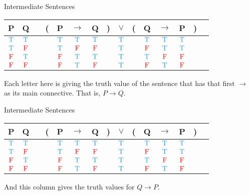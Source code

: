 \documentclass[
  ignorenonframetext,
]{beamer}
\renewcommand{\,}{\text{, }}
\def\True{\textcolor{dodgerblue}{\text{T}}}
\def\False{\textcolor{red}{\text{F}}}
\begin{document}
\begin{frame}{Intermediate Sentences}
\protect\hypertarget{intermediate-sentences-1}{}

\begin{center}
\begin{tabular}{@{ }c@{ }@{ }c | c@{ }@{}c@{}@{ }c@{ }@{ }c@{ }@{ }c@{ }@{}c@{}@{ }c@{ }@{}c@{}@{ }c@{ }@{ }c@{ }@{ }c@{ }@{}c@{}@{ }c}
P & Q &  & ( & P & $\rightarrow$ & Q & ) & $\lor$ & ( & Q & $\rightarrow$ & P & ) & \\
\hline 
$\True$ & $\True$ &  &  & $\True$ & \textbf{$\True$} & $\True$ &  & \textcolor{red}{$\True$} &  & $\True$ & $\True$ & $\True$ &  & \\
$\True$ & $\False$ &  &  & $\True$ & \textbf{$\False$} & $\False$ &  & \textcolor{red}{$\True$} &  & $\False$ & $\True$ & $\True$ &  & \\
$\False$ & $\True$ &  &  & $\False$ & \textbf{$\True$} & $\True$ &  & \textcolor{red}{$\True$} &  & $\True$ & $\False$ & $\False$ &  & \\
$\False$ & $\False$ &  &  & $\False$ & \textbf{$\True$} & $\False$ &  & \textcolor{red}{$\True$} &  & $\False$ & $\True$ & $\False$ &  & \\
\end{tabular}
\bigskip
\end{center}

Each letter here is giving the truth value of the sentence that has that
first \(\rightarrow\) as its main connective. That is,
\(P \rightarrow Q\).

\end{frame}

\begin{frame}{Intermediate Sentences}
\protect\hypertarget{intermediate-sentences-2}{}

\begin{center}
\begin{tabular}{@{ }c@{ }@{ }c | c@{ }@{}c@{}@{ }c@{ }@{ }c@{ }@{ }c@{ }@{}c@{}@{ }c@{ }@{}c@{}@{ }c@{ }@{ }c@{ }@{ }c@{ }@{}c@{}@{ }c}
P & Q &  & ( & P & $\rightarrow$ & Q & ) & $\lor$ & ( & Q & $\rightarrow$ & P & ) & \\
\hline 
$\True$ & $\True$ &  &  & $\True$ & $\True$ & $\True$ &  & \textcolor{red}{$\True$} &  & $\True$ & \textbf{$\True$} & $\True$ &  & \\
$\True$ & $\False$ &  &  & $\True$ & $\False$ & $\False$ &  & \textcolor{red}{$\True$} &  & $\False$ & \textbf{$\True$} & $\True$ &  & \\
$\False$ & $\True$ &  &  & $\False$ & $\True$ & $\True$ &  & \textcolor{red}{$\True$} &  & $\True$ & \textbf{$\False$} & $\False$ &  & \\
$\False$ & $\False$ &  &  & $\False$ & $\True$ & $\False$ &  & \textcolor{red}{$\True$} &  & $\False$ & \textbf{$\True$} & $\False$ &  & \\
\end{tabular}
\bigskip
\end{center}

And this column gives the truth values for \(Q \rightarrow P\).

\end{frame}
\end{document}

